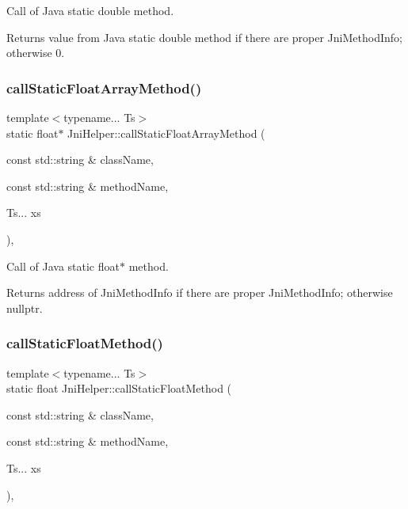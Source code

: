 Call of Java static double method. 

\begin{DoxyReturn}{Returns}
value from Java static double method if there are proper Jni\+Method\+Info; otherwise 0. 
\end{DoxyReturn}
\mbox{\label{classJniHelper_ad3f793ae3cab1bfd61fc97fa4c4d2e65}} 
\subsubsection{\texorpdfstring{call\+Static\+Float\+Array\+Method()}{callStaticFloatArrayMethod()}}
{\footnotesize\ttfamily template$<$typename... Ts$>$ \\
static float$\ast$ Jni\+Helper\+::call\+Static\+Float\+Array\+Method (\begin{DoxyParamCaption}\item[{const std\+::string \&}]{class\+Name,  }\item[{const std\+::string \&}]{method\+Name,  }\item[{Ts...}]{xs }\end{DoxyParamCaption})\hspace{0.3cm}{\ttfamily [inline]}, {\ttfamily [static]}}



Call of Java static float$\ast$ method. 

\begin{DoxyReturn}{Returns}
address of Jni\+Method\+Info if there are proper Jni\+Method\+Info; otherwise nullptr. 
\end{DoxyReturn}
\mbox{\label{classJniHelper_a67019482bf6cae8f91a828ab6372c7bb}} 
\subsubsection{\texorpdfstring{call\+Static\+Float\+Method()}{callStaticFloatMethod()}}
{\footnotesize\ttfamily template$<$typename... Ts$>$ \\
static float Jni\+Helper\+::call\+Static\+Float\+Method (\begin{DoxyParamCaption}\item[{const std\+::string \&}]{class\+Name,  }\item[{const std\+::string \&}]{method\+Name,  }\item[{Ts...}]{xs }\end{DoxyParamCaption})\hspace{0.3cm}{\ttfamily [inline]}, {\ttfamily [static]}}



